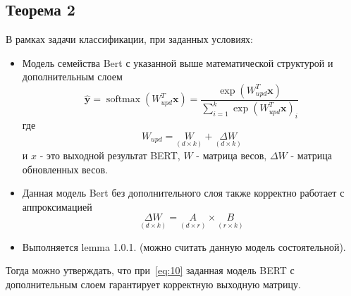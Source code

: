 \subsection{Теорема 2}
\begin{theorem}
В рамках задачи классификации, при заданных условиях:
\begin{itemize}
    \item Модель семейства Bert с указанной выше математической структурой и дополнительным слоем 
    \begin{equation}
    \label{eq:6}
        \hat{\mathbf{y}}=\operatorname{softmax}\left(W_{upd}^T \mathbf{x}\right)=\frac{\exp \left(W_{upd}^T \mathbf{x}\right)}{\sum_{i=1}^k \exp \left(W_{upd}^T \mathbf{x}\right)_i}
    \end{equation}
    где 
    \begin{equation}
    \label{eq:7}
    W_{upd} =\underset{(d \times k) }{W} + \underset{(d \times k)}{\Delta W}
    \end{equation}
    и $x$ - это выходной результат BERT, $W$ - матрица весов, $\Delta W$ - матрица обновленных весов.
    \item  Данная модель Bert без дополнительного слоя также корректно работает с аппроксимацией 
    \begin{equation}
    \label{eq:8}
    \underset{(d \times k)}{\Delta W} = \underset{(d \times r)}{ A} \times \underset{(r \times k)}{B}
    \end{equation}
    \item Выполняется lemma 1.0.1. (можно считать данную модель состоятельной).
\end{itemize}
Тогда можно утверждать, что при~\eqref{eq:10} заданная модель BERT с дополнительным слоем гарантирует корректную выходную матрицу.
\end{theorem}
\renewcommand\qedsymbol{$\blacksquare$}

